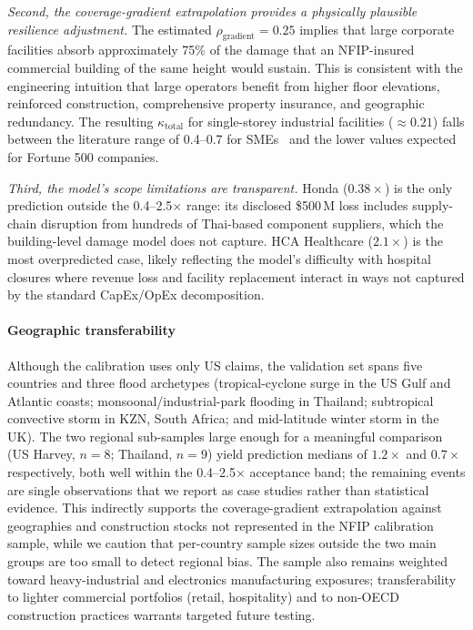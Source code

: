 \textit{Second, the coverage-gradient extrapolation provides a physically plausible resilience adjustment.} The estimated $\rho_{\text{gradient}} = 0.25$ implies that large corporate facilities absorb approximately 75\% of the damage that an NFIP-insured commercial building of the same height would sustain. This is consistent with the engineering intuition that large operators benefit from higher floor elevations, reinforced construction, comprehensive property insurance, and geographic redundancy. The resulting $\kappa_{\text{total}}$ for single-storey industrial facilities ($\approx 0.21$) falls between the literature range of 0.4--0.7 for SMEs~\cite{merz2010review, huizinga2017global} and the lower values expected for Fortune 500 companies.

\textit{Third, the model's scope limitations are transparent.} Honda ($0.38\times$) is the only prediction outside the 0.4--2.5$\times$ range: its disclosed \$500\,M loss includes supply-chain disruption from hundreds of Thai-based component suppliers, which the building-level damage model does not capture. HCA Healthcare ($2.1\times$) is the most overpredicted case, likely reflecting the model's difficulty with hospital closures where revenue loss and facility replacement interact in ways not captured by the standard CapEx/OpEx decomposition.

\paragraph{Geographic transferability} Although the calibration uses only US claims, the validation set spans five countries and three flood archetypes (tropical-cyclone surge in the US Gulf and Atlantic coasts; monsoonal/industrial-park flooding in Thailand; subtropical convective storm in KZN, South Africa; and mid-latitude winter storm in the UK). The two regional sub-samples large enough for a meaningful comparison (US Harvey, $n = 8$; Thailand, $n = 9$) yield prediction medians of $1.2\times$ and $0.7\times$ respectively, both well within the 0.4--2.5$\times$ acceptance band; the remaining events are single observations that we report as case studies rather than statistical evidence. This indirectly supports the coverage-gradient extrapolation against geographies and construction stocks not represented in the NFIP calibration sample, while we caution that per-country sample sizes outside the two main groups are too small to detect regional bias. The sample also remains weighted toward heavy-industrial and electronics manufacturing exposures; transferability to lighter commercial portfolios (retail, hospitality) and to non-OECD construction practices warrants targeted future testing.

